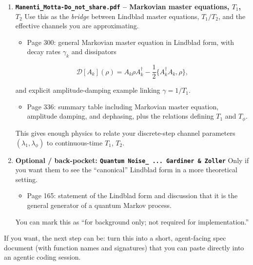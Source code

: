 \documentclass[11pt]{article}
\begin{document}
\begin{enumerate}
     and construction of two-qubit Kraus operators by tensor products.  

   Agents can use this as a sanity-check case for their multi-qubit symbolic and numeric implementations.

\item \textbf{\texttt{Manenti\_Motta-Do\_not\_share.pdf} -- Markovian master equations, $T_1$, $T_2$}  
   Use this as the \textit{bridge} between Lindblad master equations, $T_1/T_2$, and the effective channels you are approximating.

\begin{itemize}
\item Page 300: general Markovian master equation in Lindblad form, with decay rates $\gamma_k$ and dissipators
\end{itemize}
     
\begin{equation}
\mathcal{D}[A_k](\rho) = A_k \rho A_k^\dagger - \frac{1}{2}\{A_k^\dagger A_k, \rho\},
\end{equation}

     and explicit amplitude-damping example linking $\gamma = 1/T_1$.
\begin{itemize}
\item Page 336: summary table including Markovian master equation, amplitude damping, and dephasing, plus the relations defining $T_1$ and $T_\phi$.
\end{itemize}

   This gives enough physics to relate your discrete-step channel parameters $(\lambda_1, \lambda_\phi)$ to continuous-time $T_1$, $T_2$.

\item \textbf{Optional / back-pocket: \texttt{Quantum Noise\_ ... Gardiner \& Zoller}}  
   Only if you want them to see the ``canonical'' Lindblad form in a more theoretical setting.

\begin{itemize}
\item Page 165: statement of the Lindblad form and discussion that it is the general generator of a quantum Markov process.
\end{itemize}

   You can mark this as ``for background only; not required for implementation.''
\end{enumerate}

If you want, the next step can be: turn this into a short, agent-facing spec document (with function names and signatures) that you can paste directly into an agentic coding session.
\end{document}
